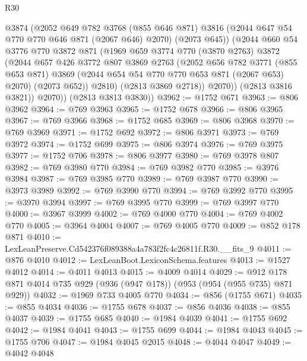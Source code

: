 \begin{lexlean}{R30}
\begin{coremodule}
              @3874
              (@2052
                @649
                @782
                @3768
                (@855 @646 @871)
                @3816
                (@2044 @647 @54 @770 @770 @646 @871 (@2067 @646) @2070)
                (@2073 @645))
              (@2044
                @660
                @54
                @3776
                @770
                @3872
                @871
                (@1969
                  @659
                  @3774
                  @770
                  (@3870 @2763)
                  @3872
                  (@2044
                    @657
                    @426
                    @3772
                    @807
                    @3869
                    @2763
                    (@2052
                      @656
                      @782
                      @3771
                      (@855 @653 @871)
                      @3869
                      (@2044 @654 @54 @770 @770 @653 @871 (@2067 @653) @2070)
                      (@2073 @652))
                    @2810)
                  (@2813 @3869 @2718))
                @2070))
            (@2813 @3816 @3821))
          @2070))
      (@2813 @3813 @3830))
@3962 := @1752 @671
@3963 := @806 @3962
@3964 := @769 @3963
@3965 := @1752 @678
@3966 := @806 @3965
@3967 := @769 @3966
@3968 := @1752 @685
@3969 := @806 @3968
@3970 := @769 @3969
@3971 := @1752 @692
@3972 := @806 @3971
@3973 := @769 @3972
@3974 := @1752 @699
@3975 := @806 @3974
@3976 := @769 @3975
@3977 := @1752 @706
@3978 := @806 @3977
@3980 := @769 @3978 @807
@3982 := @769 @3980 @770
@3984 := @769 @3982 @770
@3985 := @3976 @3984
@3987 := @769 @3985 @770
@3989 := @769 @3987 @770
@3990 := @3973 @3989
@3992 := @769 @3990 @770
@3994 := @769 @3992 @770
@3995 := @3970 @3994
@3997 := @769 @3995 @770
@3999 := @769 @3997 @770
@4000 := @3967 @3999
@4002 := @769 @4000 @770
@4004 := @769 @4002 @770
@4005 := @3964 @4004
@4007 := @769 @4005 @770
@4009 := @852 @178 @871
@4010 := LexLeanPreserve.Cd542376f089388a4a783f2fc4c26811f.R30.__fits_9
@4011 := @876 @4010
@4012 := LexLeanBoot.LexiconSchema.features
@4013 := @1527 @4012
@4014 := @4011 @4013
@4015 := @4009 @4014
@4029 := @912 @178 @871 @4014 @735 @929 (@936 (@947 @178)) (@953 (@954 (@955 @735) @871 @929))
@4032 := @1969 @733 @4005 @770
@4034 := @856 (@1755 @671)
@4035 := @855 @4034
@4036 := @1755 @678
@4037 := @856 @4036
@4038 := @855 @4037
@4039 := @1755 @685
@4040 := @1984 @4039
@4041 := @1755 @692
@4042 := @1984 @4041
@4043 := @1755 @699
@4044 := @1984 @4043
@4045 := @1755 @706
@4047 := @1984 @4045 @2015
@4048 := @4044 @4047
@4049 := @4042 @4048

\end{coremodule}
\end{lexlean}
